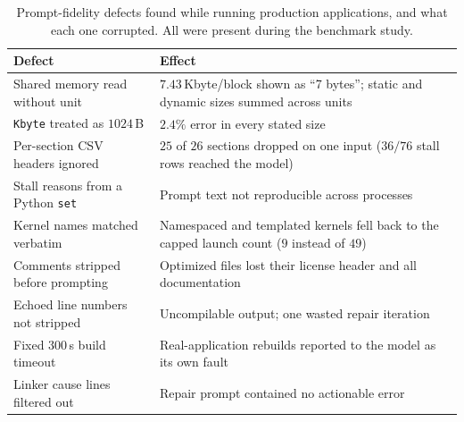 \begin{table}[t]
\centering
\footnotesize
\setlength{\tabcolsep}{3pt}
\caption{Prompt-fidelity defects found while running production applications, and what each one
  corrupted. All were present during the benchmark study.}
\label{tab:defects}
\begin{tabular}{@{}p{}p{}@{}}
\toprule
\textbf{Defect} & \textbf{Effect} \\
\midrule
Shared memory read without unit & $7.43$\,Kbyte/block shown as ``7 bytes''; static and dynamic sizes
  summed across units \\
\texttt{Kbyte} treated as $1024$\,B & $2.4\%$ error in every stated size \\
Per-section CSV headers ignored & $25$ of $26$ sections dropped on one input ($36/76$ stall rows
  reached the model) \\
Stall reasons from a Python \texttt{set} & Prompt text not reproducible across processes \\
Kernel names matched verbatim & Namespaced and templated kernels fell back to the capped launch count
  ($9$ instead of $49$) \\
Comments stripped before prompting & Optimized files lost their license header and all documentation \\
Echoed line numbers not stripped & Uncompilable output; one wasted repair iteration \\
Fixed $300$\,s build timeout & Real-application rebuilds reported to the model as its own fault \\
Linker cause lines filtered out & Repair prompt contained no actionable error \\
\bottomrule
\end{tabular}
\end{table}
